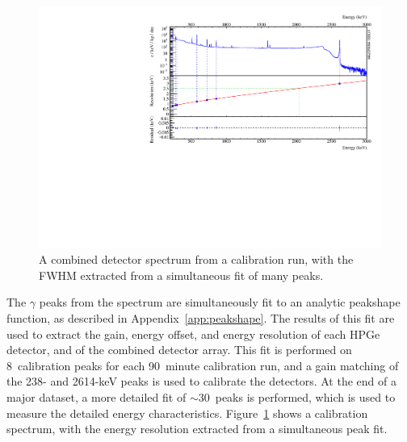 \documentclass[/main.tex]{subfiles}
\begin{document}
\begin{figure}
  \centering
  \includegraphics[width=\textwidth]{calfwhm}
  \caption[Calibration spectrum with FWHM]{\label{fig:calfwhm}
    A combined detector spectrum from a  calibration run, with the FWHM extracted from a simultaneous fit of many peaks.
  }
\end{figure}
The $\gamma$ peaks from the  spectrum are simultaneously fit to an analytic peakshape function, as described in Appendix~\ref{app:peakshape}.
The results of this fit are used to extract the gain, energy offset, and energy resolution of each HPGe detector, and of the combined detector array.
This fit is performed on 8~calibration peaks for each 90~minute calibration run, and a gain matching of the 238- and 2614-keV peaks is used to calibrate the detectors.
At the end of a major dataset, a more detailed fit of ${\sim}30$~peaks is performed, which is used to measure the detailed energy characteristics.
Figure~\ref{fig:calfwhm} shows a  calibration spectrum, with the energy resolution extracted from a simultaneous peak fit.
\end{document}
